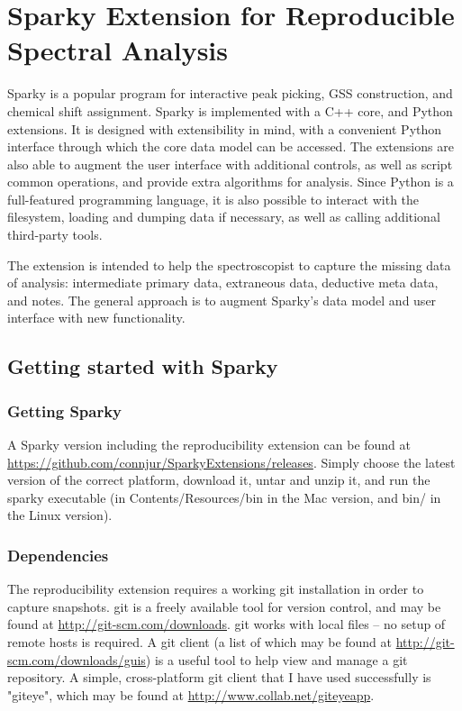 \chapter{Sparky Extension for Reproducible Spectral Analysis}

Sparky \cite{sparky} is a popular program for interactive peak picking,
GSS construction, and chemical shift assignment.  Sparky is implemented 
with a C++ core, and Python extensions.  It is designed with
extensibility in mind, with a convenient Python interface through which 
the core data model can be accessed.  The
extensions are also able to augment the user interface with additional
controls, as well as script common operations, and provide extra algorithms
for analysis.  Since Python is a full-featured programming language, 
it is also possible to interact with the filesystem, loading and dumping
data if necessary, as well as calling additional third-party tools.

The extension is intended to help the spectroscopist to capture the 
missing data of analysis: intermediate primary data, extraneous
data, deductive meta data, and notes.  The general approach is to augment
Sparky's data model and user interface with new functionality.



\section{Getting started with Sparky}

\subsection*{Getting Sparky}
A Sparky version including the reproducibility extension can be found at
\url{https://github.com/connjur/SparkyExtensions/releases}.  Simply 
choose the latest version of the correct platform, download it, untar and 
unzip it, and run the sparky executable (in Contents/Resources/bin in the
Mac version, and bin/ in the Linux version).

\subsection*{Dependencies}
The reproducibility extension requires a working git installation in order
to capture snapshots.  git is a freely available tool for version control,
and may be found at \url{http://git-scm.com/downloads}.
git works with local files -- no setup of remote hosts is required.
A git client (a list of which may be found at \url{http://git-scm.com/downloads/guis})
is a useful tool to help view and manage a git repository.  A simple,
cross-platform git client that I have used successfully is "giteye",
which may be found at \url{http://www.collab.net/giteyeapp}.

